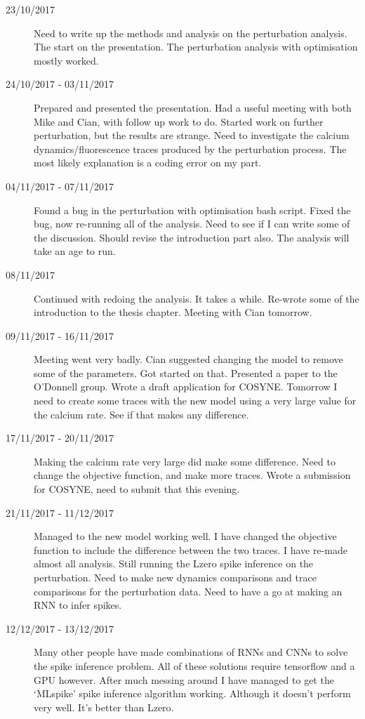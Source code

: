 \documentclass[a4paper,12pt]{article}
\theoremstyle{definition}
\begin{document}
\begin{description}
  \item[23/10/2017] Need to write up the methods and analysis on the perturbation analysis. The start on the presentation. The perturbation analysis with optimisation mostly worked.

  \item[24/10/2017 - 03/11/2017] Prepared and presented the presentation. Had a useful meeting with both Mike and Cian, with follow up work to do. Started work on further perturbation, but the results are strange. Need to investigate the calcium dynamics/fluorescence traces produced by the perturbation process. The most likely explanation is a coding error on my part.

  \item[04/11/2017 - 07/11/2017] Found a bug in the perturbation with optimisation bash script. Fixed the bug, now re-running all of the analysis. Need to see if I can write some of the discussion. Should revise the introduction part also. The analysis will take an age to run.

  \item[08/11/2017] Continued with redoing the analysis. It takes a while. Re-wrote some of the introduction to the thesis chapter. Meeting with Cian tomorrow.

  \item[09/11/2017 - 16/11/2017] Meeting went very badly. Cian suggested changing the model to remove some of the parameters. Got started on that. Presented a paper to the O'Donnell group. Wrote a draft application for COSYNE. Tomorrow I need to create some traces with the new model using a very large value for the calcium rate. See if that makes any difference.

  \item[17/11/2017 - 20/11/2017] Making the calcium rate very large did make some difference. Need to change the objective function, and make more traces. Wrote a submission for COSYNE, need to submit that this evening.

  \item[21/11/2017 - 11/12/2017] Managed to the new model working well. I have changed the objective function to include the difference between the two traces. I have re-made almost all analysis. Still running the Lzero spike inference on the perturbation. Need to make new dynamics comparisons and trace comparisons for the perturbation data. Need to have a go at making an RNN to infer spikes.

  \item[12/12/2017 - 13/12/2017] Many other people have made combinations of RNNs and CNNs to solve the spike inference problem. All of these solutions require tensorflow and a GPU however. After much messing around I have managed to get the `MLspike' spike inference algorithm working. Although it doesn't perform very well. It's better than Lzero.


\end{description}
\end{document}
